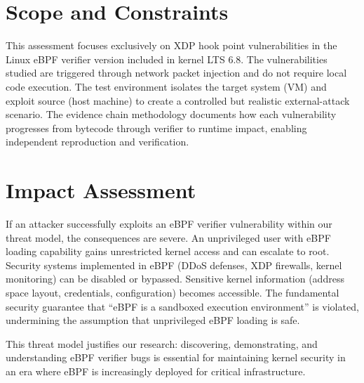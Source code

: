 \section{Scope and Constraints}

\noindent
This assessment focuses exclusively on XDP hook point vulnerabilities in the Linux eBPF verifier version included in kernel LTS 6.8. The vulnerabilities studied are triggered through network packet injection and do not require local code execution. The test environment isolates the target system (VM) and exploit source (host machine) to create a controlled but realistic external-attack scenario. The evidence chain methodology documents how each vulnerability progresses from bytecode through verifier to runtime impact, enabling independent reproduction and verification.

\section{Impact Assessment}

If an attacker successfully exploits an eBPF verifier vulnerability within our threat model, the consequences are severe. An unprivileged user with eBPF loading capability gains unrestricted kernel access and can escalate to root. Security systems implemented in eBPF (DDoS defenses, XDP firewalls, kernel monitoring) can be disabled or bypassed. Sensitive kernel information (address space layout, credentials, configuration) becomes accessible. The fundamental security guarantee that ``eBPF is a sandboxed execution environment'' is violated, undermining the assumption that unprivileged eBPF loading is safe.

\noindent
This threat model justifies our research: discovering, demonstrating, and understanding eBPF verifier bugs is essential for maintaining kernel security in an era where eBPF is increasingly deployed for critical infrastructure.
